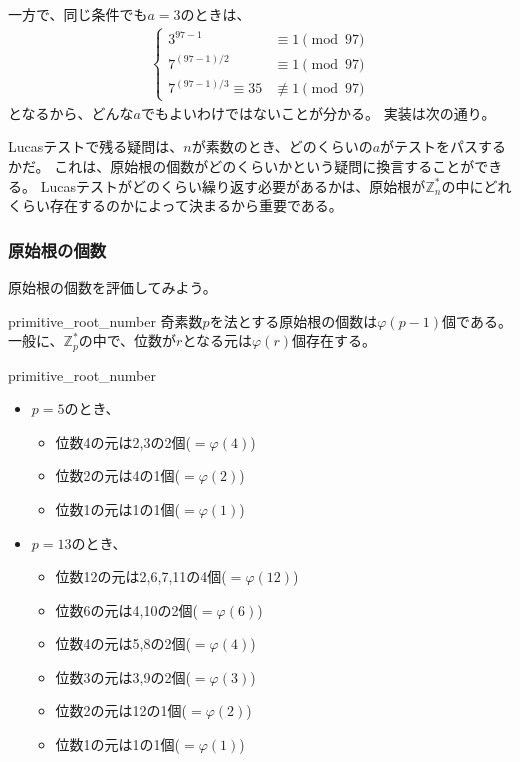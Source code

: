 一方で、同じ条件でも$a=3$のときは、
\begin{align*}
\begin{cases}
3^{97-1} &\equiv 1 \pmod{97}\\
7^{(97-1)/2}  &\equiv 1 \pmod{97}\\
7^{(97-1)/3}  \equiv 35 &\not\equiv 1 \pmod{97}
\end{cases}
\end{align*}
となるから、どんな$a$でもよいわけではないことが分かる。
実装は次の通り。


Lucasテストで残る疑問は、$n$が素数のとき、どのくらいの$a$がテストをパスするかだ。
これは、原始根の個数がどのくらいかという疑問に換言することができる。
Lucasテストがどのくらい繰り返す必要があるかは、原始根が$\mathbb{Z}_n^*$の中にどれくらい存在するのかによって決まるから重要である。

\subsubsection{原始根の個数}
原始根の個数を評価してみよう。

\begin{Prop}{}{primitive_root_number}
奇素数$p$を法とする原始根の個数は$\varphi(p-1)$個である。
一般に、$\mathbb{Z}_p^*$の中で、位数が$r$となる元は$\varphi(r)$個存在する。
\end{Prop}

\begin{Exam}{}{primitive_root_number}\;
\begin{itemize}
 \item $p=5$のとき、
  \begin{itemize}
   \item 位数4の元は2,3の2個($=\varphi(4)$)
   \item 位数2の元は4の1個($=\varphi(2)$)
   \item 位数1の元は1の1個($=\varphi(1)$)
  \end{itemize}
  \item $p=13$のとき、
  \begin{itemize}
   \item 位数12の元は2,6,7,11の4個($=\varphi(12)$)
   \item 位数6の元は4,10の2個($=\varphi(6)$)
   \item 位数4の元は5,8の2個($=\varphi(4)$)
   \item 位数3の元は3,9の2個($=\varphi(3)$)
   \item 位数2の元は12の1個($=\varphi(2)$)
   \item 位数1の元は1の1個($=\varphi(1)$)
  \end{itemize}
\end{itemize}
\end{Exam}

